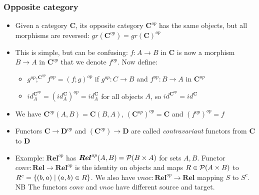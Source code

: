 \documentclass[handout]{beamer}
\newcommand{\bfsf}[1]{{\boldsymbol{#1}}}
\newcommand{\CC}{\bfsf{C}}
\newcommand{\DD}{\bfsf{D}}
\newcommand{\Rel}{\bfsf{Rel}}
\begin{document}
\frame
  {   
    \frametitle{Opposite category}\label{Ch2:OppCat}

 \begin{itemize}[<+->]
\item Given a category $\CC$, its opposite category $\CC^{op}$ has the same
objects, but all morphisms are reversed: $gr(\CC^{op}) = gr(\CC)^{op}$
\item This is simple, but can be confusing: $f: A\to B$ in $\CC$ is now a
morphism $B\to A$ in $\CC^{op}$ that we denote $f^{op}$. Now define:
   \begin{itemize}[<+->]
\item$g^{op};^{\CC^{op}} f^{op} = (f; g)^{op}$ if $g^{op}:C\to B$ and $f^{op}: B\to A$ in $\CC^{op}$
\item $id^{\CC^{op}}_A = (id^\CC_A)^{op} = id^\CC_A$ for all objects $A$,
so $id^{\CC^{op}} = id^\CC$
   \end{itemize}
\item We have $\CC^{op}(A,B)=\CC(B,A)$, $(\CC^{op})^{op}= \CC$ and $(f^{op})^{op}= f$
\item Functors $\CC\to\DD^{op}$ and $(\CC^{op})\to \DD$ are called
\emph{contravariant} functors from $\CC$ to $\DD$
\item Example: $\Rel^{op}$ has $\Rel^{op}(A,B)=\powset(B\times A)$
for sets $A,B$. Functor $conv: \Rel\to\Rel^{op}$ is the identity on objects 
and maps $R\in\operatorname{\mathcal{P}}(A\times B)$ to $R^c = \{(b,a)\mid (a,b)\in R\}$.
We also have $vnoc: \Rel^{op}\to\Rel$ mapping $S$ to $S^c$. NB The functors
$conv$ and $vnoc$ have different source and target.
 \end{itemize}

 }
\end{document}
